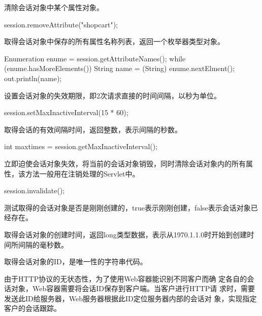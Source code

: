 
清除会话对象中某个属性对象。

\begin{javaCode}
  session.removeAttribute("shopcart");
\end{javaCode}



取得会话对象中保存的所有属性名称列表，返回一个枚举器类型对象。
\begin{javaCode}
  Enumeration enume = session.getAttributeNames();
  while (enume.hasMoreElements()) {
    String name = (String) enume.nextElment();
    out.println(name);
  }
\end{javaCode}


设置会话对象的失效期限，即2次请求直接的时间间隔，以秒为单位。
\begin{javaCode}
  session.setMaxInactiveInterval(15 * 60);
\end{javaCode}


取得会话的有效间隔时间，返回整数，表示间隔的秒数。
\begin{javaCode}
  int maxtimes = session.getMaxInactiveInterval();
\end{javaCode}


立即迫使会话对象失效，将当前的会话对象销毁，同时清除会话对象内的所有属性，该方法一般用在注销处理的Servlet中。
\begin{javaCode}
  session.invalidate();
\end{javaCode}


测试取得的会话对象是否是刚刚创建的，true表示刚刚创建，false表示会话对象已经存在。


取得会话对象的创建时间，返回long类型数据，表示从1970.1.1.0时开始到创建时间所间隔的毫秒数。



取得会话对象的ID，是唯一性的字符串代码。

{\kai\Blue 由于HTTP协议的无状态性，为了使用Web容器能识别不同客户而确
  定各自的会话对象，Web容器需要将会话ID保存到客户端。当客户进行HTTP请
  求时，需要发送此ID给服务器，Web服务器根据此ID定位服务器内部的会话对
  象，实现指定客户的会话跟踪。}

